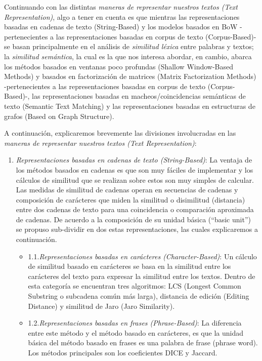 \documentclass[12pt,a4paper]{article}
\begin{document}
\begin{sloppypar}
\begin{enumerate}
\end{enumerate}

Continuando con las distintas \textit{maneras de representar nuestros textos (Text Representation)}, algo a tener en cuenta es que mientras las representaciones basadas en cadenas de texto (String-Based) y los modelos basados en BoW -pertenecientes a las representaciones basadas en corpus de texto (Corpus-Based)- se basan principalmente en el análisis de \textit{similitud léxica} entre palabras y textos; la \textit{similitud semántica}, la cual es la que nos interesa abordar, en cambio, abarca los métodos basados en ventanas poco profundas (Shallow Window-Based Methods) y basados en factorización de matrices (Matrix Factorization Methods) -pertenecientes a las representaciones basadas en corpus de texto (Corpus-Based)-, las representaciones basadas en macheos/coincidencias semánticas de texto (Semantic Text Matching) y las representaciones basadas en estructuras de grafos (Based on Graph Structure). 

A continuación, explicaremos brevemente las divisiones involucradas en las \textit{maneras de representar nuestros textos (Text Representation)}\cite{similarity_survey}:

\begin{enumerate}

\item \textit{Representaciones basadas en cadenas de texto (String-Based)}:
La ventaja de los métodos basados en cadenas es que son muy fáciles de implementar y los cálculos de similitud que se realizan sobre estos son muy simples de calcular. Las medidas de similitud de cadenas operan en secuencias de cadenas y composición de carácteres que miden la similitud o disimilitud (distancia) entre dos cadenas de texto para una coincidencia o comparación aproximada de cadenas. De acuerdo a la composición de su unidad básica (``basic unit'') se propuso sub-dividir en dos estas representaciones, las cuales explicaremos a continuación.

\begin{itemize}
\item 1.1.\textit{Representaciones basadas en carácteres (Character-Based)}: Un cálculo de similitud basado en carácteres se basa en la similitud entre los carácteres del texto para expresar la similitud entre los textos. Dentro de esta categoría se encuentran tres algoritmos: LCS (Longest Common Substring o subcadena común más larga), distancia de edición (Editing Distance) y similitud de Jaro (Jaro Similarity).
\item 1.2.\textit{Representaciones basadas en frases (Phrase-Based)}: La diferencia entre este método y el método basado en carácteres, es que la unidad básica del método basado en frases es una palabra de frase (phrase word). Los métodos principales son los coeficientes DICE y Jaccard. 
\end{itemize}


\end{enumerate}
\end{sloppypar}
\end{document}
